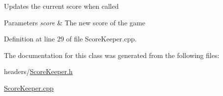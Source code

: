 Updates the current score when called 
\begin{DoxyParams}{Parameters}
{\em score} & The new score of the game \\
\hline
\end{DoxyParams}


Definition at line 29 of file Score\+Keeper.\+cpp.



The documentation for this class was generated from the following files\+:\begin{DoxyCompactItemize}
\item 
headers/\mbox{\hyperlink{_score_keeper_8h}{Score\+Keeper.\+h}}\item 
\mbox{\hyperlink{_score_keeper_8cpp}{Score\+Keeper.\+cpp}}\end{DoxyCompactItemize}
